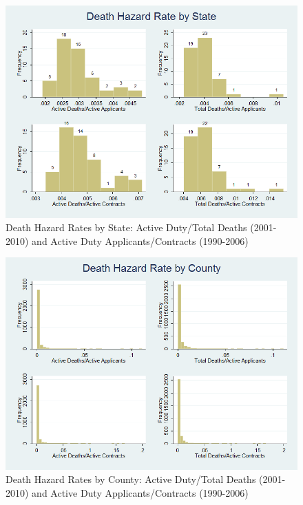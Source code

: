 \documentclass[12pt] {article}
\begin{document}
\begin{figure}
\includegraphics[scale=0.5]{../Output/hist_state_combined.png}
\caption{Death Hazard Rates by State: Active Duty/Total Deaths (2001-2010) and Active Duty Applicants/Contracts (1990-2006)}
\label{Flo:HISTOstatedeaths}
\end{figure}

\begin{figure}
\includegraphics[scale=0.5]{../Output/hist_county_combined.png}
\caption{Death Hazard Rates by County: Active Duty/Total Deaths (2001-2010) and Active Duty Applicants/Contracts (1990-2006)}
\label{Flo:HISTOcountydeaths}
\end{figure}
\end{document}
